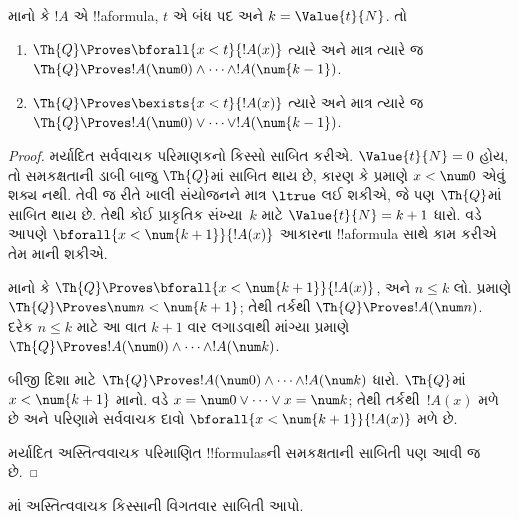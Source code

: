 \documentclass[../../../include/open-logic-section]{subfiles}
\begin{document}
\begin{lem}
માનો કે $!A$ એ !!a{formula},
$t$ એ બંધ પદ અને
$k=\Value{t}{N}$. તો
\begin{enumerate}
\item $\Th{Q} \Proves \bforall{x<t}{!A(x)}$
ત્યારે અને માત્ર ત્યારે જ
$\Th{Q} \Proves
    !A(\num 0) \land \dots \land !A(\num{k-1})$.
\item $\Th{Q} \Proves \bexists{x<t}{!A(x)}$
ત્યારે અને માત્ર ત્યારે જ
$\Th{Q} \Proves
    !A(\num 0) \lor \dots \lor !A(\num{k-1})$.
\end{enumerate}
\end{lem}

\begin{proof}
    મર્યાદિત સર્વવાચક પરિમાણકનો
    કિસ્સો સાબિત કરીએ.
    $\Value{t}{N} = 0$ હોય,
    તો સમકક્ષતાની ડાબી બાજુ
    $\Th{Q}$માં સાબિત થાય છે,
    કારણ કે 
    પ્રમાણે $x<\num 0$
    એવું શક્ય નથી.
    તેવી જ રીતે ખાલી સંયોજનને
    માત્ર $\ltrue$ લઈ શકીએ,
    જે પણ $\Th{Q}$માં
    સાબિત થાય છે.
    તેથી કોઈ પ્રાકૃતિક સંખ્યા~$k$
    માટે $\Value{t}{N} = k+1$
    ધારો. 
    વડે આપણે
    $\bforall{x<\num{k+1}}{!A(x)}$
    આકારના !!a{formula} સાથે
    કામ કરીએ તેમ માની શકીએ.
    
    માનો કે $\Th{Q} \Proves
    \bforall{x<\num{k+1}}{!A(x)}$,
    અને $n \leq k$ લો.
    પ્રમાણે $\Th{Q} \Proves
    \num n < \num{k+1}$;
    તેથી તર્કથી $\Th{Q} \Proves
    !A(\num n)$. દરેક
    $n \leq k$ માટે આ વાત
    $k+1$ વાર લગાડવાથી
    માંગ્યા પ્રમાણે
    $\Th{Q} \Proves !A(\num 0)
    \land \dots \land !A(\num k)$.
    
    બીજી દિશા માટે
    $\Th{Q} \Proves
    !A(\num 0) \land \dots \land !A(\num k)$
    ધારો. $\Th{Q}$માં
    $x < \num{k+1}$ માનો.
    વડે
    $x = \num 0 \lor \dots \lor x = \num k$;
    તેથી તર્કથી~$!A(x)$
    મળે છે અને પરિણામે
    સર્વવાચક દાવો
    $\bforall{x<\num{k+1}}{!A(x)}$
    મળે છે.
    
    મર્યાદિત અસ્તિત્વવાચક
    પરિમાણિત !!{formula}sની
    સમકક્ષતાની સાબિતી પણ આવી જ છે.
\end{proof}

\begin{prob}
માં
અસ્તિત્વવાચક કિસ્સાની વિગતવાર
સાબિતી આપો.
\end{prob}
\end{document}
